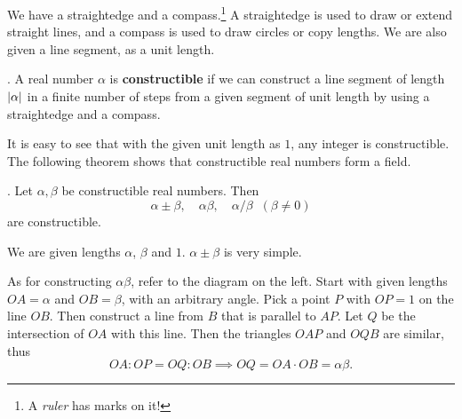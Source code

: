 \pagebreak


We have a straightedge and a compass.\footnote{A \textit{ruler} has marks on it!} A straightedge is used to draw or extend straight lines, and a compass is used to draw circles or copy lengths. We are also given a line segment, as a unit length.

.  A real number \(\alpha\) is \textbf{constructible} if we can construct a line segment of length \(\left| \alpha \right|\) in a finite number of steps from a given segment of unit length by using a straightedge and a compass.

It is easy to see that with the given unit length as \(1\), any integer is constructible. The following theorem shows that constructible real numbers form a field.

\thm. Let \(\alpha, \beta\) be constructible real numbers. Then
\[
    \alpha \pm \beta, \quad \alpha\beta, \quad \alpha / \beta\;\; (\beta \neq 0)
\]
are constructible.

\pf We are given lengths \(\alpha\), \(\beta\) and \(1\). \(\alpha \pm \beta\) is very simple.

As for constructing \(\alpha \beta\), refer to the diagram on the left. Start with given lengths \(OA = \alpha\) and \(OB = \beta\), with an arbitrary angle. Pick a point \(P\) with \(OP = 1\) on the line \(OB\). Then construct a line from \(B\) that is parallel to \(AP\). Let \(Q\) be the intersection of \(OA\) with this line. Then the triangles \(OAP\) and \(OQB\) are similar, thus
\[
    OA : OP = OQ : OB \implies OQ = OA \cdot OB = \alpha \beta.
\]

